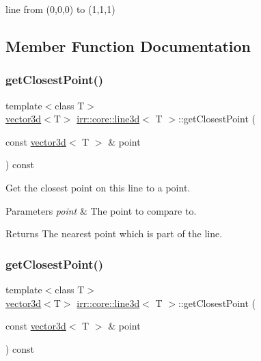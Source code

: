 line from (0,0,0) to (1,1,1) 

\subsection{Member Function Documentation}
\mbox{\label{classirr_1_1core_1_1line3d_a40fefd94d9fe0d206eb46e6db52826dc}} 
\subsubsection{\texorpdfstring{get\+Closest\+Point()}{getClosestPoint()}\hspace{0.1cm}{\footnotesize\ttfamily [1/2]}}
{\footnotesize\ttfamily template$<$class T$>$ \\
\hyperlink{classirr_1_1core_1_1vector3d}{vector3d}$<$T$>$ \hyperlink{classirr_1_1core_1_1line3d}{irr\+::core\+::line3d}$<$ T $>$\+::get\+Closest\+Point (\begin{DoxyParamCaption}\item[{const \hyperlink{classirr_1_1core_1_1vector3d}{vector3d}$<$ T $>$ \&}]{point }\end{DoxyParamCaption}) const\hspace{0.3cm}{\ttfamily [inline]}}



Get the closest point on this line to a point. 


\begin{DoxyParams}{Parameters}
{\em point} & The point to compare to. \\
\hline
\end{DoxyParams}
\begin{DoxyReturn}{Returns}
The nearest point which is part of the line. 
\end{DoxyReturn}
\mbox{\label{classirr_1_1core_1_1line3d_a40fefd94d9fe0d206eb46e6db52826dc}} 
\subsubsection{\texorpdfstring{get\+Closest\+Point()}{getClosestPoint()}\hspace{0.1cm}{\footnotesize\ttfamily [2/2]}}
{\footnotesize\ttfamily template$<$class T$>$ \\
\hyperlink{classirr_1_1core_1_1vector3d}{vector3d}$<$T$>$ \hyperlink{classirr_1_1core_1_1line3d}{irr\+::core\+::line3d}$<$ T $>$\+::get\+Closest\+Point (\begin{DoxyParamCaption}\item[{const \hyperlink{classirr_1_1core_1_1vector3d}{vector3d}$<$ T $>$ \&}]{point }\end{DoxyParamCaption}) const\hspace{0.3cm}{\ttfamily [inline]}}



